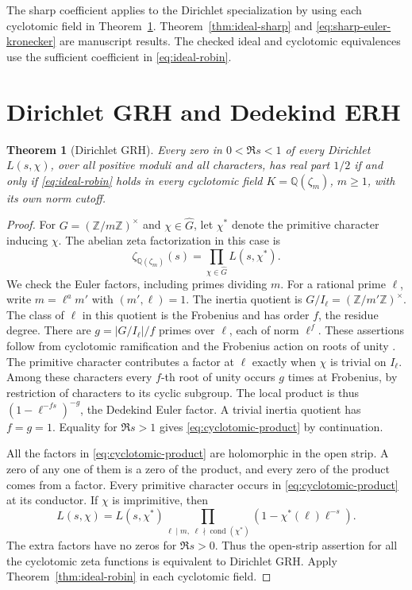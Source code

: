 \documentclass[11pt]{amsart}
\newtheorem{theorem}{Theorem}[section]
\theoremstyle{definition}
\theoremstyle{remark}
\numberwithin{equation}{section}
\begin{document}
The sharp coefficient applies to the Dirichlet specialization by
using each cyclotomic field in Theorem~\ref{thm:dirichlet-cyclotomic}.
Theorem~\ref{thm:ideal-sharp} and
\eqref{eq:sharp-euler-kronecker} are manuscript results.
The checked ideal and cyclotomic equivalences use
the sufficient coefficient in \eqref{eq:ideal-robin}.

\section{Dirichlet GRH and Dedekind ERH}\label{sec:dirichlet-erh}

\begin{theorem}[Dirichlet GRH]\label{thm:dirichlet-cyclotomic}
Every zero in \(0<\Re s<1\) of every Dirichlet \(L(s,\chi)\), over
all positive moduli and all characters, has real part \(1/2\) if
and only if \eqref{eq:ideal-robin} holds in every cyclotomic field
\(K=\mathbb Q(\zeta_m)\), \(m\geq1\), with its own norm cutoff.
\end{theorem}

\begin{proof}
For \(G=(\mathbb Z/m\mathbb Z)^\times\) and \(\chi\in\widehat G\),
let \(\chi^*\) denote the primitive character inducing \(\chi\).
The abelian zeta factorization in this case is
\begin{equation}\label{eq:cyclotomic-product}
 \zeta_{\mathbb Q(\zeta_m)}(s)=\prod_{\chi\in\widehat G}L(s,\chi^*).
\end{equation}
We check the Euler factors, including primes dividing \(m\).
For a rational prime \(\ell\), write \(m=\ell^a m'\) with
\((m',\ell)=1\). The inertia quotient is
\(G/I_\ell=(\mathbb Z/m'\mathbb Z)^\times\). The class of \(\ell\)
in this quotient is the Frobenius and has order \(f\), the residue
degree. There are \(g=|G/I_\ell|/f\) primes over \(\ell\),
each of norm \(\ell^f\). These assertions follow from cyclotomic
ramification and the Frobenius action on roots of unity
\cite[Ch.\,2 and 4]{WashingtonCyclotomic}.
The primitive character contributes a factor at \(\ell\) exactly
when \(\chi\) is trivial on \(I_\ell\). Among these characters every
\(f\)-th root of unity occurs \(g\) times at Frobenius, by restriction
of characters to its cyclic subgroup. The local product is thus
\((1-\ell^{-fs})^{-g}\), the Dedekind Euler factor. A trivial inertia
quotient has \(f=g=1\). Equality for \(\Re s>1\) gives
\eqref{eq:cyclotomic-product} by continuation.

All the factors in \eqref{eq:cyclotomic-product} are holomorphic
in the open strip. A zero of any one of them is a zero of the
product, and every zero of the product comes from a factor.
Every primitive character occurs in \eqref{eq:cyclotomic-product}
at its conductor. If \(\chi\) is imprimitive, then
\[
 L(s,\chi)=L(s,\chi^*)\prod_{\ell\mid m,\;\ell\nmid
                  \operatorname{cond}(\chi^*)}
                    (1-\chi^*(\ell)\ell^{-s}).
\]
The extra factors have no zeros for \(\Re s>0\). Thus the open-strip
assertion for all the cyclotomic zeta functions is equivalent to
Dirichlet GRH. Apply Theorem~\ref{thm:ideal-robin} in each cyclotomic
field.
\end{proof}
\end{document}

